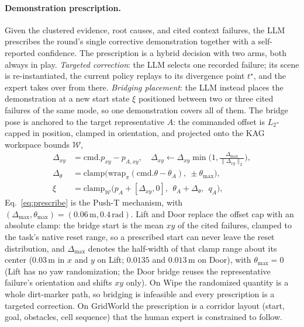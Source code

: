 \documentclass[letterpaper]{article} %
\begin{document}
\paragraph{Demonstration prescription.}
Given the clustered evidence, root causes, and cited context failures, the
LLM prescribes the round's single corrective demonstration together with a
self-reported confidence. The prescription is a hybrid decision with two
arms, both always in play. \emph{Targeted correction}: the LLM selects one
recorded failure; its scene is re-instantiated, the current policy replays to
its divergence point $t^\star$, and the expert takes over from there.
\emph{Bridging placement}: the LLM instead places the demonstration at
a new start state $\xi$ positioned between two or three cited failures of the
same mode, so one demonstration covers all of them. The bridge pose is
anchored to the target representative $A$: the commanded offset is
$L_2$-capped in position, clamped in orientation, and projected onto the KAG
workspace bounds $\mathcal{W}$,
\begin{align}
\Delta_{xy}&=\mathrm{cmd}.p_{xy}-p_{A,xy},
\quad
\Delta_{xy}\leftarrow
\Delta_{xy}\min\!\Big(1,\tfrac{\Delta_{\max}}{\|\Delta_{xy}\|_2}\Big),
\nonumber\\
\Delta_{\theta}&=\mathrm{clamp}\big(
\mathrm{wrap}_{\pi}(\mathrm{cmd}.\theta-\theta_A),\ \pm\theta_{\max}\big),
\nonumber\\
\xi&=\mathrm{clamp}_{\mathcal{W}}\big(
p_A+[\Delta_{xy},0],\ \ \theta_A+\Delta_{\theta},\ \ q_A\big),
\label{eq:prescribe}
\end{align}
Eq.~\ref{eq:prescribe} is the Push-T mechanism, with
$(\Delta_{\max},\theta_{\max})=(0.06\,\mathrm{m},0.4\,\mathrm{rad})$. Lift
and Door replace the offset cap with an absolute clamp: the bridge start is
the mean $xy$ of the cited failures, clamped to the task's native reset
range, so a prescribed start can never leave the reset distribution, and
$\Delta_{\max}$ denotes the half-width of that clamp range about its center
($0.03$\,m in $x$ and $y$ on Lift; $0.0135$ and $0.013$\,m on Door), with
$\theta_{\max}=0$ (Lift has no yaw randomization; the Door bridge reuses
the representative failure's orientation and shifts $xy$ only). On Wipe
the randomized quantity is a whole dirt-marker path, so bridging is
infeasible and every prescription is a targeted correction. On GridWorld the
prescription is a corridor layout (start, goal, obstacles, cell sequence)
that the human expert is constrained to follow.
\end{document}
